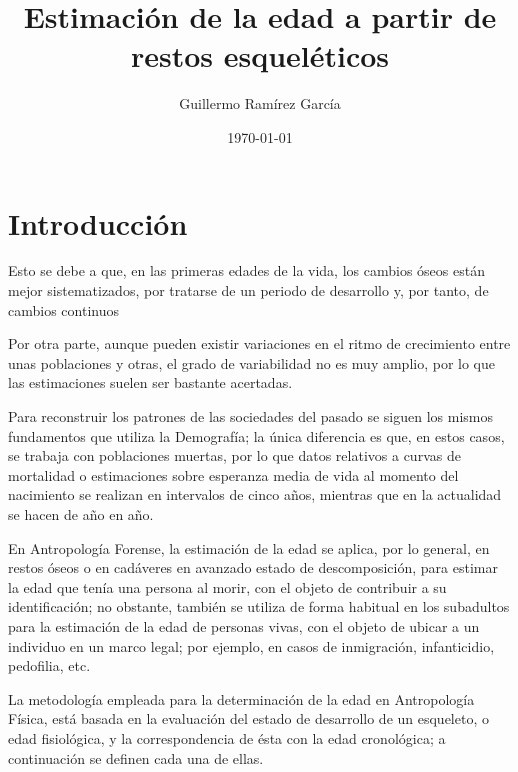 \documentclass[a4paper,11pt]{article}
\begin{document}
\title{\Huge Estimación de la edad a partir de restos esqueléticos}
\author{Guillermo Ramírez García}
\date{\today}
\maketitle
{}
\part{Introducción}
Esto se debe a que, en las primeras edades de la vida, los cambios óseos están mejor sistematizados, por tratarse de un periodo de desarrollo y, por tanto, de cambios continuos \cite{scheuer2004juvenile}

Por otra parte, aunque pueden existir variaciones en el ritmo de crecimiento entre unas poblaciones y otras, el grado de variabilidad no es muy amplio, por lo que las estimaciones suelen ser bastante acertadas.

Para reconstruir los patrones de las sociedades del pasado se siguen los mismos fundamentos que utiliza la Demografía; la única diferencia es que, en estos casos, se trabaja con poblaciones muertas, por lo que datos relativos a curvas de mortalidad o estimaciones sobre esperanza media de vida al momento del nacimiento se realizan en intervalos de cinco años, mientras que en la actualidad se hacen de año en año.

En Antropología Forense, la estimación de la edad se aplica, por lo general, en restos óseos o en cadáveres en avanzado estado de descomposición, para estimar la edad que tenía una persona al morir, con el objeto de contribuir a su identificación; no obstante, también se utiliza de forma habitual en los subadultos para la estimación de la edad de personas vivas, con el objeto de ubicar a un individuo en un marco legal; por ejemplo, en casos de inmigración, infanticidio, pedofilia, etc.
            
La metodología empleada para la determinación de la edad en Antropología Física, está basada en la evaluación del estado de desarrollo de un esqueleto, o edad fisiológica, y la correspondencia de ésta con la edad cronológica; a continuación se definen cada una de ellas.

\end{document}
